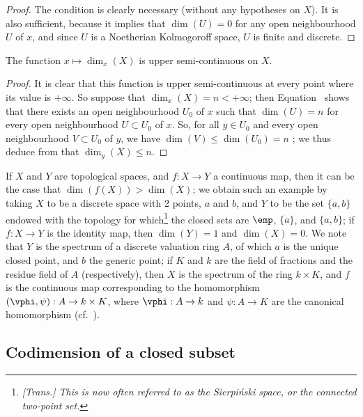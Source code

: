 \begin{proof}
The condition is clearly necessary (without any hypotheses on $X$).
It is also sufficient,
because it implies that $\dim(U)=0$ for any open neighbourhood $U$ of $x$, and since $U$ is a Noetherian Kolmogoroff space, $U$ is finite and discrete.
\end{proof}

\begin{proposition}[14.1.11]
\label{0.14.1.11}
The function $x\mapsto\dim_x(X)$ is upper semi-continuous on $X$.
\end{proposition}

\begin{proof}
It is clear that this function is upper semi-continuous at every point where its value is $+\infty$.
So suppose that $\dim_x(X)=n<+\infty$;
then Equation~ shows that there exists an open neighbourhood $U_0$ of $x$ such that $\dim(U)=n$ for every open neighbourhood $U\subset U_0$ of $x$.
So, for all $y\in U_0$ and every open neighbourhood $V\subset U_0$ of $y$, we have $\dim(V)\leq\dim(U_0)=n$ ;
we thus deduce from  that $\dim_y(X)\leq n$.
\end{proof}

\begin{remark}[14.1.12]
\label{0.14.1.12}
If $X$ and $Y$ are topological spaces, and $f:X\to Y$ a continuous map, then it can be the case that $\dim(f(X))>\dim(X)$;
we obtain such an example by taking $X$ to be a discrete space with 2 points, $a$ and $b$, and $Y$ to be the set $\{a,b\}$ endowed with the topology for which\footnote{\emph{[Trans.] This is now often referred to as the \emph{Sierpi\'nski space}, or the \emph{connected two-point set}.}} the closed sets are $\emp$, $\{a\}$, and $\{a,b\}$;
if $f:X\to Y$ is the identity map, then $\dim(Y)=1$ and $\dim(X)=0$.
We note that $Y$ is the spectrum of a discrete valuation ring $A$, of which $a$ is the unique closed point, and $b$ the generic point;
if $K$ and $k$ are the field of fractions and the residue field of $A$ (respectively), then $X$ is the spectrum of the ring $k\times K$, and $f$ is the continuous map corresponding to the homomorphism $(\vphi,\psi):A\to k\times K$, where $\vphi:A\to k$ and $\psi:A\to K$ are the canonical homomorphism (cf.~).
\end{remark}

\subsection{Codimension of a closed subset}
\label{subsection:0.14.2}

